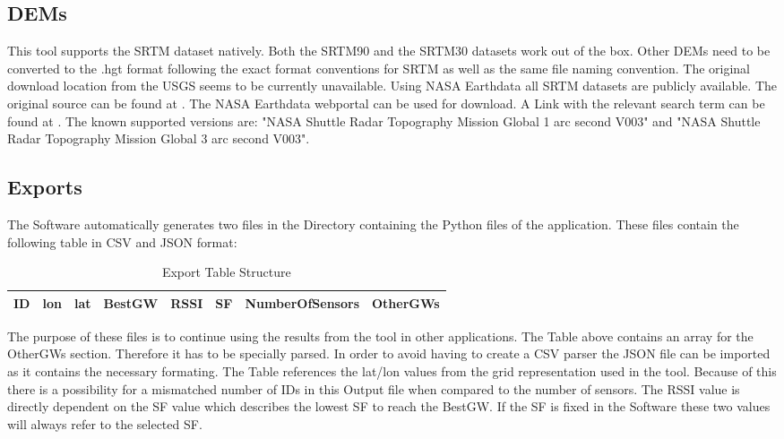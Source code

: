 \documentclass[12pt,a4paper]{article}
\begin{document}
\subsection{DEMs}
This tool supports the SRTM dataset natively. Both the SRTM90 and the SRTM30 datasets work out of the box. Other DEMs need to be converted to the .hgt format following the exact format conventions for SRTM as well as the same file naming convention. The original download location from the USGS seems to be currently unavailable. Using NASA Earthdata all SRTM datasets are publicly available. The original source can be found at \cite{srtm_orig}. The NASA Earthdata webportal can be used for download. A Link with the relevant search term can be found at \cite{srtm_earthdata}. The known supported versions are: "NASA Shuttle Radar Topography Mission Global 1 arc second V003" and "NASA Shuttle Radar Topography Mission Global 3 arc second V003".
\subsection{Exports}
The Software automatically generates two files in the Directory containing the Python files of the application. These files contain the following table in CSV and JSON format:
\begin{table}[!th]
	\centering
	\caption{Export Table Structure}
	\begin{tabular}{|c|c|c|c|c|c|c|c|}
		\hline
		ID&lon&lat&BestGW&RSSI&SF&NumberOfSensors&OtherGWs \\
		\hline
	\end{tabular}
\end{table}
The purpose of these files is to continue using the results from the tool in other applications. The Table above contains an array for the OtherGWs section. Therefore it has to be specially parsed. In order to avoid having to create a CSV parser the JSON file can be imported as it contains the necessary formating. The Table references the lat/lon values from the grid representation used in the tool. Because of this there is a possibility for a mismatched number of IDs in this Output file when compared to the number of sensors. The RSSI value is directly dependent on the SF value which describes the lowest SF to reach the BestGW. If the SF is fixed in the Software these two values will always refer to the selected SF.
\end{document}
